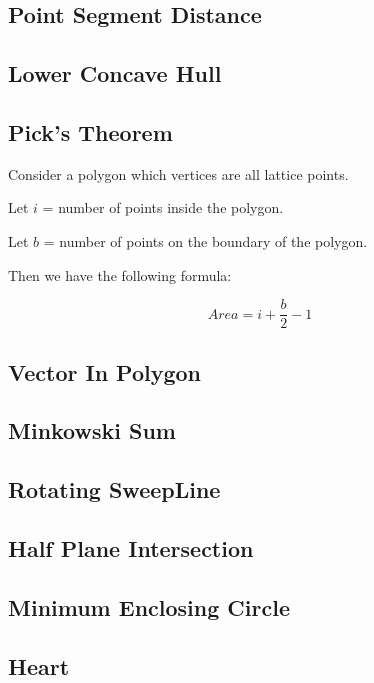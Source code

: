 \documentclass[a4paper,10pt,twocolumn,oneside,x11names]{article}
\begin{document}
\subsection{Point Segment Distance}


\subsection{Lower Concave Hull}



\subsection{Pick's Theorem}
Consider a polygon which vertices are all lattice points.

Let $i$ = number of points inside the polygon.

Let $b$ = number of points on the boundary of the polygon.

Then we have the following formula:

$$
Area = i + \frac{b}{2} - 1
$$

\subsection{Vector In Polygon}

\subsection{Minkowski Sum}


\subsection{Rotating SweepLine}

\subsection{Half Plane Intersection}


\subsection{Minimum Enclosing Circle}


\subsection{Heart}
\end{document}
